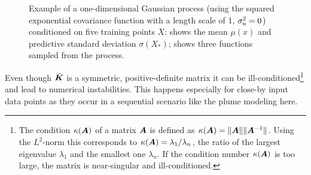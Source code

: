 \begin{figure}
    \centering
    \hspace{0.5cm}%
    \caption[Gaussian process example]{Example of a one-dimensional Gaussian 
        process (using the squared exponential covariance function with 
        a length scale of 1, $\sigma_{\mathrm{n}}^2 = 0$) conditioned on five training 
        points $X$:  shows the mean $\mu(x)$ and predictive 
        standard deviation $\sigma(X_*)$;  shows three 
        functions sampled from the process.}\label{fig:ex-gp-main}
\end{figure}

Even though $\tilde{\bm{K}}$ is a symmetric, positive-definite matrix it can be 
ill-conditioned\footnote{The condition $\kappa(\bm{A})$ of a matrix $\bm{A}$ is 
    defined as $\kappa(\bm{A}) = \|\bm{A}\| \|\bm{A}^{-1}\|$. Using the 
    $L^2$-norm this corresponds to $\kappa(\bm{A}) = \lambda_1/\lambda_n$,
    the ratio of the largest eigenvalue $\lambda_1$ and the smallest one
    $\lambda_n$. If the condition number $\kappa(\bm{A})$ is too large, the 
    matrix is near-singular and ill-conditioned.} and lead to numerical 
instabilities. This happens especially for close-by input data points as they 
occur in a sequential scenario like the plume modeling here.

